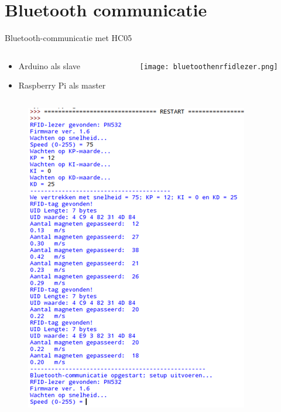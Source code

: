 \documentclass[t,12pt,english
\ifx\beamermode\undefined\else,\beamermode\fi
]{beamer}
\begin{document}
\section{Bluetooth communicatie}
\begin{frame}{Bluetooth-communicatie met HC05}
\begin{columns}
	\begin{column}{0.5\textwidth}
		\begin{itemize}
			\item[] Arduino als slave
			\item[] Raspberry Pi als master
		\end{itemize}
	\end{column}
	\begin{column}{0.5\textwidth}  
		\begin{center}
			\texttt{[image: bluetoothenrfidlezer.png]}
		\end{center}
	\end{column}
\end{columns} 
\end{frame}

\begin{frame}{}
\begin{figure}[H]
	\centering
	\includegraphics[width=\textwidth,height=0.8\textheight,keepaspectratio]{bluetoothoutputvoorbeeldbijgesneden2.png}
\end{figure}
\end{frame}
\end{document}
